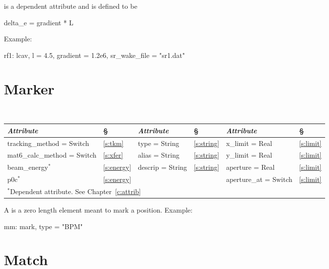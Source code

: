 {{ is a dependent attribute and is
defined to be
\begin{example}
  delta_e = gradient * L
\end{example}

Example:
\begin{example}
  rf1: lcav, l = 4.5, gradient = 1.2e6, sr\_wake\_file = "sr1.dat"
\end{example}

\section{Marker}
\label{s:mark}

\begin{center}
\tt
\begin{tabular}{|l|l||l|l||l|l|} \hline
  {\sl Attribute} & \S  & {\sl Attribute} & \S & {\sl Attribute} & \S \\ \hline
  tracking\_method = Switch    & \ref{s:tkm}   &  type = String      & \ref{s:string} & x\_limit = Real       & \ref{s:limit} \\ \hline 
  mat6\_calc\_method = Switch  & \ref{s:xfer}  &  alias = String     & \ref{s:string} & y\_limit = Real       & \ref{s:limit} \\ \hline 
  beam\_energy$^*$             & \ref{s:energy}&  descrip = String   & \ref{s:string} & aperture = Real       & \ref{s:limit} \\ \hline 
  p0c$^*$                      & \ref{s:energy}&                     &                & aperture\_at = Switch & \ref{s:limit} \\ \hline
  \multicolumn{6}{l}{\small $^*$Dependent attribute. See Chapter~\ref{c:attrib}} \\
\end{tabular}
\end{center}
\toffset

A  is a zero length element meant to mark a position.
Example:
\begin{example}
  mm: mark, type = "BPM"
\end{example}

\section{Match}
\label{s:match}

}}
